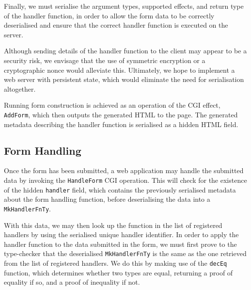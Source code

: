 Finally, we must serialise the argument types, supported effects, and return type of the handler function, in order to allow the form data to be correctly deserialised and ensure that the correct handler function is executed on the server. 

Although sending details of the handler function to the client may appear to be a security risk, we envisage that the use of symmetric encryption or a cryptographic nonce would alleviate this. Ultimately, we hope to implement a web server with persistent state, which would eliminate the need for serialisation altogether.

Running form construction is achieved as an operation of the CGI
effect, \texttt{AddForm}, which then outputs the generated HTML to the page.
The generated metadata describing the handler function is serialised as a
hidden HTML field.

\subsection{Form Handling}
\label{formhandling}
Once the form has been submitted, a web application may handle the submitted data by invoking the \texttt{HandleForm} CGI operation. This will check for the existence of the hidden \texttt{handler} field, which contains the previously serialised metadata about the form handling function, before deserialising the data into a \texttt{MkHandlerFnTy}. 

With this data, we may then look up the function in the list of registered handlers by using the serialised unique handler identifier. In order to apply the handler function to the data submitted in the form, we must first prove to the type-checker that the deserialised \texttt{MkHandlerFnTy} is the same as the one retrieved from the list of registered handlers. We do this by making use of the \texttt{decEq} function, which determines whether two types are equal, returning a proof of equality if so, and a proof of inequality if not.

